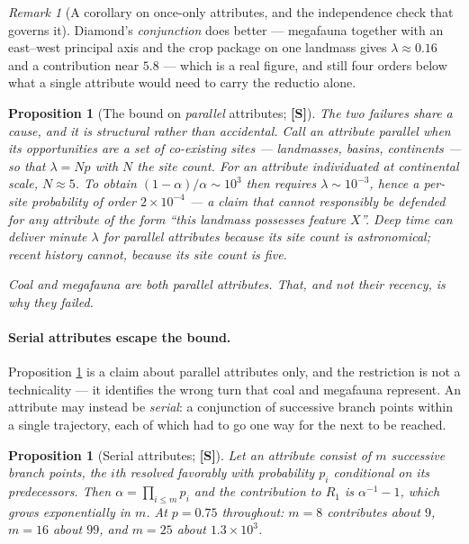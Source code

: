 \documentclass[11pt]{article}
\numberwithin{equation}{section}
\theoremstyle{plain}
\newtheorem{proposition}[theorem]{Proposition}
\theoremstyle{definition}
\theoremstyle{remark}
\newtheorem{remark}[theorem]{Remark}
\begin{document}
\begin{remark}[A corollary on once-only attributes, and the independence
check that governs it]
Diamond's \emph{conjunction} does better --- megafauna together with an
east--west principal axis and the crop package on one landmass gives
$\lambda\approx0.16$ and a contribution near $5.8$ --- which is a real
figure, and still four orders below what a single attribute would need
to carry the reductio alone.

\begin{proposition}[The bound on \emph{parallel} attributes;
\textbf{[S]}]\label{gc:prop:squeeze}
The two failures share a cause, and it is structural rather than
accidental. Call an attribute \emph{parallel} when its opportunities are
a set of co-existing sites --- landmasses, basins, continents --- so
that $\lambda=Np$ with $N$ the site count. For an attribute individuated
at continental scale, $N\approx5$. To obtain
$(1-\alpha)/\alpha\sim10^{3}$ then requires $\lambda\sim10^{-3}$, hence
a per-site probability of order $2\times10^{-4}$ --- a claim that cannot
responsibly be defended for any attribute of the form ``this landmass
possesses feature $X$''. Deep time can deliver minute $\lambda$ for
parallel attributes because its site count is astronomical; recent
history cannot, because its site count is five.

Coal and megafauna are both parallel attributes. That, and not their
recency, is why they failed.
\end{proposition}

\paragraph{Serial attributes escape the bound.} Proposition
\ref{gc:prop:squeeze} is a claim about parallel attributes only, and the
restriction is not a technicality --- it identifies the wrong turn that
coal and megafauna represent. An attribute may instead be
\emph{serial}: a conjunction of successive branch points within a single
trajectory, each of which had to go one way for the next to be reached.

\begin{proposition}[Serial attributes; \textbf{[S]}]
\label{gc:prop:cascade}
Let an attribute consist of $m$ successive branch points, the $i$th
resolved favorably with probability $p_i$ conditional on its
predecessors. Then $\alpha=\prod_{i\le m}p_i$ and the contribution to
$R_1$ is $\alpha^{-1}-1$, which grows \emph{exponentially in $m$}. At
$p=0.75$ throughout: $m=8$ contributes about $9$, $m=16$ about $99$,
and $m=25$ about $1.3\times10^{3}$.
\end{proposition}


\end{remark}
\end{document}
